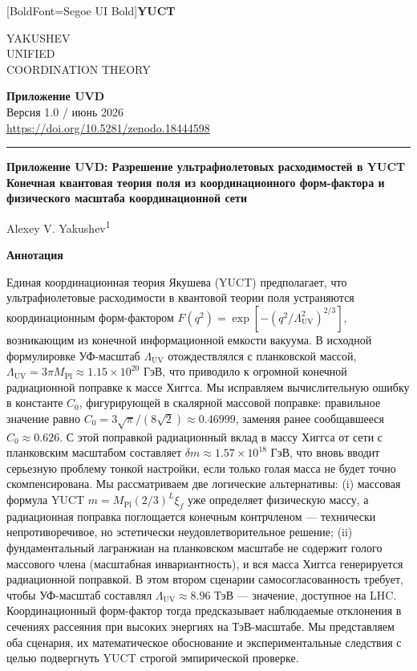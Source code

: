 \documentclass[11pt,a4paper]{article}
\newcommand{\Mpl}{M_{\mathrm{Pl}}}
\newcommand{\LUV}{\Lambda_{\mathrm{UV}}}
\theoremstyle{remark}
\newcommand{\makeheader}{%
	\noindent
	\begin{minipage}{0.17\textwidth}
		\raggedright
		{\fontspec{Segoe UI}[BoldFont=Segoe UI Bold]\bfseries\color{skyblue}\fontsize{46}{46}\selectfont YUCT}%
	\end{minipage}%
	\hspace{30pt}
	\begin{minipage}{0.32\textwidth}
		\raggedright
		{\sffamily\fontsize{11}{13}\selectfont YAKUSHEV\\ UNIFIED\\ COORDINATION THEORY}%
	\end{minipage}%
	\hfill
	\begin{minipage}{0.38\textwidth}
		\raggedleft
		{\sffamily\bfseries Приложение UVD}\\ 
		{\sffamily Версия 1.0 / июнь 2026}\\ 
		{\sffamily\footnotesize \url{https://doi.org/10.5281/zenodo.18444598}}%
	\end{minipage}
	\par\vspace{5pt}
	\noindent\textcolor{gold}{\rule{\textwidth}{1.6pt}}
	\par\vspace{0pt}
}
\begin{document}
	
	\thispagestyle{firstpage}
	\makeheader
	
	\vspace{0.5cm}
	{\LARGE\bfseries Приложение UVD: Разрешение ультрафиолетовых расходимостей в YUCT \\
		\Large Конечная квантовая теория поля из координационного форм-фактора и физического масштаба координационной сети \par}
	\vspace{0.3cm}
	
	{\large Alexey V. Yakushev\textsuperscript{1}} \\
	\vspace{0.2cm}
	
	{\color{darkblue}\textbf{\LARGE Аннотация}} \par
	{\large
		\noindent
		Единая координационная теория Якушева (YUCT) предполагает, что ультрафиолетовые расходимости в квантовой теории поля устраняются координационным форм-фактором \(F(q^2) = \exp[-(q^2/\LUV^2)^{2/3}]\), возникающим из конечной информационной емкости вакуума. В исходной формулировке УФ-масштаб \(\LUV\) отождествлялся с планковской массой, \(\LUV = 3\pi\Mpl \approx 1.15\times 10^{20}\) ГэВ, что приводило к огромной конечной радиационной поправке к массе Хиггса. Мы исправляем вычислительную ошибку в константе \(C_0\), фигурирующей в скалярной массовой поправке: правильное значение равно \(C_0 = 3\sqrt{\pi}/(8\sqrt{2}) \approx 0.46999\), заменяя ранее сообщавшееся \(C_0 \approx 0.626\). С этой поправкой радиационный вклад в массу Хиггса от сети с планковским масштабом составляет \(\delta m \approx 1.57\times 10^{18}\) ГэВ, что вновь вводит серьезную проблему тонкой настройки, если только голая масса не будет точно скомпенсирована. Мы рассматриваем две логические альтернативы: (i) массовая формула YUCT \(m = \Mpl(2/3)^L\xi_f\) уже определяет физическую массу, а радиационная поправка поглощается конечным контрчленом — технически непротиворечивое, но эстетически неудовлетворительное решение; (ii) фундаментальный лагранжиан на планковском масштабе не содержит голого массового члена (масштабная инвариантность), и вся масса Хиггса генерируется радиационной поправкой. В этом втором сценарии самосогласованность требует, чтобы УФ-масштаб составлял \(\LUV \approx 8.96\) ТэВ — значение, доступное на LHC. Координационный форм-фактор тогда предсказывает наблюдаемые отклонения в сечениях рассеяния при высоких энергиях на ТэВ-масштабе. Мы представляем оба сценария, их математическое обоснование и экспериментальные следствия с целью подвергнуть YUCT строгой эмпирической проверке.
	}
	
\end{document}

